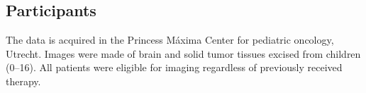 \subsection{Participants}

The data is acquired in the Princess Máxima Center for pediatric oncology, Utrecht.
Images were made of brain and solid tumor tissues excised from children (0--16).
All patients were eligible for imaging regardless of previously received therapy.
